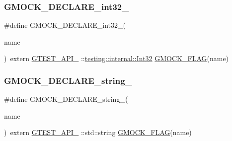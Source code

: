 \mbox{\label{googletest-master_2googlemock_2include_2gmock_2internal_2gmock-port_8h_adeb7f0a8d842d1d541615763835af3f9}} 
\subsubsection{\texorpdfstring{GMOCK\_DECLARE\_int32\_}{GMOCK\_DECLARE\_int32\_}}
{\footnotesize\ttfamily \#define G\+M\+O\+C\+K\+\_\+\+D\+E\+C\+L\+A\+R\+E\+\_\+int32\+\_\+(\begin{DoxyParamCaption}\item[{}]{name }\end{DoxyParamCaption})~extern \mbox{\hyperlink{_obj__test_2lib_2googletest-release-1_88_81_2googletest_2include_2gtest_2internal_2gtest-port_8h_aa73be6f0ba4a7456180a94904ce17790}{G\+T\+E\+S\+T\+\_\+\+A\+P\+I\+\_\+}} \+::\mbox{\hyperlink{namespacetesting_1_1internal_af89e21e4043b5cf0c120af487b24fa06}{testing\+::internal\+::\+Int32}} \mbox{\hyperlink{_obj__test_2lib_2googletest-release-1_88_81_2googlemock_2include_2gmock_2internal_2gmock-port_8h_ad7119adfef06be5e7b1551633f5a1436}{G\+M\+O\+C\+K\+\_\+\+F\+L\+AG}}(name)}

\mbox{\label{googletest-master_2googlemock_2include_2gmock_2internal_2gmock-port_8h_a35af08c45131cf68d78446cb8cfe40fe}} 
\subsubsection{\texorpdfstring{GMOCK\_DECLARE\_string\_}{GMOCK\_DECLARE\_string\_}}
{\footnotesize\ttfamily \#define G\+M\+O\+C\+K\+\_\+\+D\+E\+C\+L\+A\+R\+E\+\_\+string\+\_\+(\begin{DoxyParamCaption}\item[{}]{name }\end{DoxyParamCaption})~extern \mbox{\hyperlink{_obj__test_2lib_2googletest-release-1_88_81_2googletest_2include_2gtest_2internal_2gtest-port_8h_aa73be6f0ba4a7456180a94904ce17790}{G\+T\+E\+S\+T\+\_\+\+A\+P\+I\+\_\+}} \+::std\+::string \mbox{\hyperlink{_obj__test_2lib_2googletest-release-1_88_81_2googlemock_2include_2gmock_2internal_2gmock-port_8h_ad7119adfef06be5e7b1551633f5a1436}{G\+M\+O\+C\+K\+\_\+\+F\+L\+AG}}(name)}

